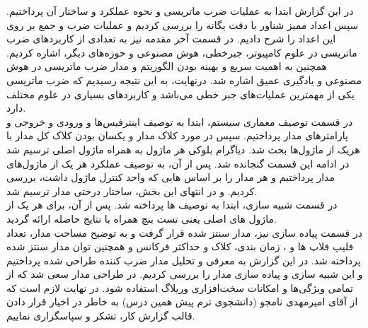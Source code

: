 \documentclass[12pt,titlepage,a4page , tikz , multi,table , svgnames,xcdraw]{article}
\begin{document}
در این گزارش ابتدا به عملیات ضرب ماتریسی و نحوه عملکرد و ساختار آن پرداختیم. سپس اعداد ممیز شناور با دقت یگانه را بررسی کردیم و عملیات ضرب و جمع بر روی این اعداد را شرح دادیم. در قسمت آخر مقدمه نیز به تعدادی از کاربردهای ضرب ماتریسی در علوم کامپیوتر، جبرخطی، هوش مصنوعی و حوزه‌های دیگر، اشاره کردیم. همچنین به اهمیت سریع و بهینه بودن الگوریتم و مدار ضرب ماتریسی در هوش مصنوعی و یادگیری عمیق اشاره شد. درنهایت، به این نتیجه رسیدیم که ضرب ماتریسی یکی از مهمترین عملیات‌های جبر خطی می‌باشد و کاربردهای بسیاری در علوم مختلف دارد. \\
در قسمت توصیف معماری سیستم، ابتدا به توصیف اینترفیس‌ها و ورودی و خروجی و پارامترهای مدار پرداختیم. سپس در مورد کلاک مدار و یکسان بودن کلاک کل مدار با هریک از ماژول‌ها بحث شد. دیاگرام بلوکی هر ماژول به همراه ماژول اصلی ترسیم شد در ادامه این قسمت گنجانده شد. پس از آن، به توصیف عملکرد هر یک از ماژول‌های مدار پرداختیم و هر مدار را بر اساس 
 ‌هایی که واحد کنترل ماژول داشت، بررسی کردیم. و در انتهای این بخش، ساختار درختی مدار ترسیم شد. \\
در قسمت شبیه سازی، ابتدا به توصیف 
ها پرداخته شد. پس از آن، برای هر یک از ماژول های اصلی یعنی
تست بنچ همراه با نتایج حاصله ارائه گردید. \\
در قسمت پیاده سازی نیز، مدار سنتز شده قرار گرفت و به توضیح مساحت مدار، تعداد فلیپ فلاپ ها و 
 ، زمان بندی، کلاک و حداکثر فرکانس و همچنین توان مدار سنتز شده پرداخته شد. 
در این گزارش به معرفی و تحلیل مدار ضرب کننده طراحی شده پرداختیم و این شبیه سازی و پیاده سازی مدار را بررسی کردیم. در طراحی مدار سعی شد که از تمامی ویژگی‌ها و امکانات سخت‌افزاری وریلاگ استفاده شود. در نهایت لازم است که از آقای امیرمهدی نامجو (دانشجوی ترم پیش همین درس) به خاطر در اخیار قرار دادن قالب 
\lr{\LaTeX} 
گزارش کار، تشکر و سپاس‍گزاری نماییم.


\newpage
\medskip




\end{document}
